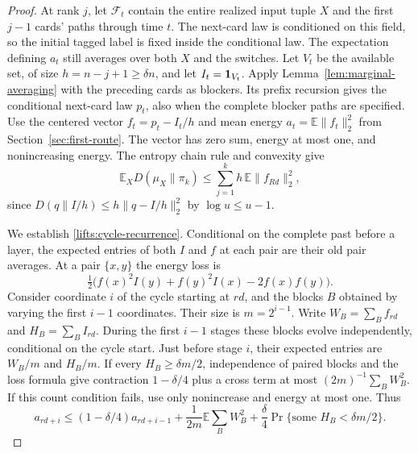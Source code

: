 \begin{proof}
At rank $j$, let $\mathcal F_t$ contain the entire realized input
tuple $X$ and the first $j-1$ cards' paths through time $t$. The
next-card law is conditioned on this field, so the initial tagged label
is fixed inside the conditional law. The expectation defining $a_t$
still averages over both $X$ and the switches. Let $V_t$ be the
available set, of size $h=n-j+1\ge\delta n$,
and let $I_t=\mathbf 1_{V_t}$. Apply Lemma~\ref{lem:marginal-averaging}
with the preceding cards as blockers. Its prefix recursion gives the
conditional next-card law $p_t$, also when the complete blocker paths
are specified. Use the centered vector $f_t=p_t-I_t/h$ and mean energy
$a_t=\mathbb E\|f_t\|_2^2$ from Section~\ref{sec:first-route}.
The vector has zero sum, energy at most one, and nonincreasing energy.
The entropy chain rule and convexity give
\begin{equation}
 \mathbb E_XD(\mu_X\|\pi_k)
 \le \sum_{j=1}^k h\,\mathbb E\|f_{Rd}\|_2^2,
 \label{lifts:entropy-chain}
\end{equation}
since $D(q\|I/h)\le h\|q-I/h\|_2^2$ by $\log u\le u-1$.

We establish \eqref{lifts:cycle-recurrence}. Conditional on the complete
past before a layer, the expected entries of both $I$ and $f$ at each
pair are their old pair averages. At a pair $\{x,y\}$ the energy loss is
\[
 \tfrac12\big(f(x)^2I(y)+f(y)^2I(x)-2f(x)f(y)\big).
\]
Consider coordinate $i$ of the cycle starting at $rd$, and the blocks
$B$ obtained by varying the first $i-1$ coordinates. Their size is
$m=2^{i-1}$. Write $W_B=\sum_Bf_{rd}$ and $H_B=\sum_BI_{rd}$.
During the first $i-1$ stages these blocks evolve independently,
conditional on the cycle start. Just before stage $i$, their expected
entries are $W_B/m$ and $H_B/m$. If every $H_B\ge\delta m/2$,
independence of paired blocks and the loss formula give contraction
$1-\delta/4$ plus a cross term at most
$(2m)^{-1}\sum_BW_B^2$. If this count condition fails, use only
nonincrease and energy at most one. Thus
\begin{equation}
 a_{rd+i}\le(1-\delta/4)a_{rd+i-1}
 +\frac1{2m}\mathbb E\sum_BW_B^2
 +\frac\delta4\Pr\{\text{some }H_B<\delta m/2\}.
 \label{lifts:cycle-stage}
\end{equation}


\end{proof}
